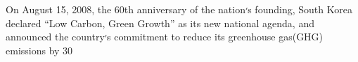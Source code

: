 On August 15, 2008, the 60th anniversary of the nation׳s founding, South Korea declared “Low Carbon, Green Growth” as its new national agenda, and announced the country׳s commitment to reduce its greenhouse gas(GHG) emissions by 30%